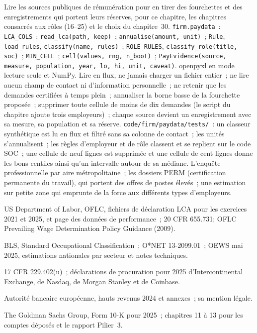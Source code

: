 \begin{build}
 Lire les sources publiques de rémunération pour en tirer des fourchettes et des enregistrements qui portent leurs réserves, pour ce chapitre, les chapitres consacrés
aux rôles (16--25) et le choix du chapitre~30.
 \texttt{firm.paydata}~: \texttt{LCA\_COLS}~; \texttt{read\_lca(path, keep)}~;
\texttt{annualise(amount, unit)}~; \texttt{Rule}, \texttt{load\_rules}, \texttt{classify(name, rules)}~; \texttt{ROLE\_RULES},
\texttt{classify\_role(title, soc)}~; \texttt{MIN\_CELL}~; \texttt{cell(values, rng, n\_boot)}~;
\texttt{PayEvidence(source, measure, population, year, lo, hi, unit, caveat)}. openpyxl en mode lecture seule et NumPy.
 Lire en flux, ne jamais charger un fichier entier~; ne lire aucun champ de contact ni d'information personnelle~; ne retenir que les demandes certifiées à temps plein~;
annualiser la borne basse de la fourchette proposée~; supprimer toute cellule de moins de dix demandes (le script du chapitre ajoute
trois employeurs)~; chaque source devient un enregistrement avec sa mesure, sa population et sa réserve.
 \texttt{code/firm/paydata/tests/}~: un classeur synthétique est lu en flux et filtré sans sa
colonne de contact~; les unités s'annualisent~; les règles d'employeur et de rôle classent et se replient sur le code SOC~; une cellule de neuf lignes est
supprimée et une cellule de cent lignes donne les bons centiles ainsi qu'un intervalle autour de sa médiane.
 L'enquête professionnelle par aire métropolitaine~; les dossiers PERM (certification permanente du travail), qui portent
des offres de postes élevés~; une estimation sur petite zone qui emprunte de la force aux différents types d'employeurs.
\end{build}

\begin{omsources}
\item US Department of Labor, OFLC, fichiers de déclaration LCA pour les exercices 2021 et 2025, et page des données de performance~;
20 CFR 655.731; OFLC Prevailing Wage Determination Policy Guidance (2009).
\item BLS, Standard Occupational Classification~; O*NET 13-2099.01~; OEWS mai 2025, estimations nationales par secteur
et notes techniques.
\item 17 CFR 229.402(u)~; déclarations de procuration pour 2025 d'Intercontinental Exchange, de Nasdaq, de Morgan Stanley et de Coinbase.
\item Autorité bancaire européenne, hauts revenus 2024 et annexes~; sa mention légale.
\item The Goldman Sachs Group, Form 10-K pour 2025~; chapitres 11 à 13 pour les comptes déposés et le rapport Pilier~3.
\end{omsources}

